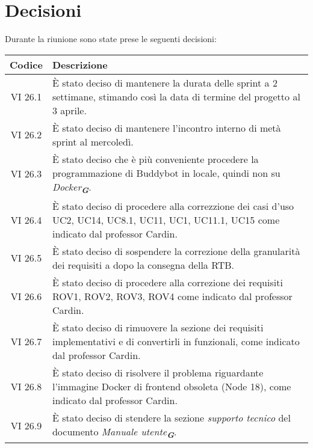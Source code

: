 
\section{Decisioni}

Durante la riunione sono state prese le seguenti decisioni:

\vspace{0.5cm}

\begin{table}[htbp]
    \centering
    \begin{tabular}{|c|p{}|}
        \hline
        \rowcolor[gray]{0.75}
        \textbf{Codice} & \textbf{Descrizione}\\
        \hline
        VI 26.1 & È stato deciso di mantenere la durata delle sprint a 2 settimane, stimando così la data di termine del progetto al 3 aprile. \\
        \hline
        VI 26.2 & È stato deciso di mantenere l'incontro interno di metà sprint al mercoledì. \\
        \hline
        VI 26.3 & È stato deciso che è più conveniente procedere la programmazione di Buddybot in locale, quindi non su \emph{Docker}\textsubscript{\textit{\textbf{G}}}. \\
        \hline
        VI 26.4 & È stato deciso di procedere alla correzzione dei casi d'uso UC2, UC14, UC8.1, UC11, UC1, UC11.1, UC15 come indicato dal professor Cardin. \\
        \hline
        VI 26.5 & È stato deciso di sospendere la correzione della granularità dei requisiti a dopo la consegna della RTB. \\
        \hline
        VI 26.6 & È stato deciso di procedere alla correzione dei requisiti ROV1, ROV2, ROV3, ROV4 come indicato dal professor Cardin. \\
        \hline
        VI 26.7 & È stato deciso di rimuovere la sezione dei requisiti implementativi e di convertirli in funzionali, come indicato dal professor Cardin. \\
        \hline
        VI 26.8 & È stato deciso di risolvere il problema riguardante l'immagine Docker di frontend obsoleta (Node 18), come indicato dal professor Cardin. \\
        \hline
        VI 26.9 & È stato deciso di stendere la sezione \emph{supporto tecnico}  del documento \emph{Manuale utente}\textsubscript{\textit{\textbf{G}}}. \\

\end{tabular}
\end{table}
